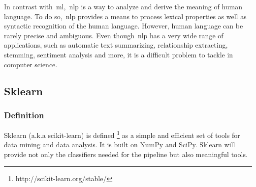 In contrast with~\ac{ml},~\ac{nlp} is a way to analyze and derive the meaning of human language. To do so,~\ac{nlp} provides a means to process lexical properties as well as syntactic recognition of the human language. However, human language can be rarely precise and ambiguous. Even though~\ac{nlp} has a very wide range of applications, such as automatic text summarizing, relationship extracting, stemming, sentiment analysis and more, it is a difficult problem to tackle in computer science.

\subsection{Sklearn}
\subsubsection{Definition}
Sklearn (a.k.a scikit-learn) is defined \footnote{http://scikit-learn.org/stable/} as a simple and efficient set of tools for data mining and data analysis. It is built on NumPy and SciPy. Sklearn will provide not only the classifiers needed for the pipeline but also meaningful tools.
